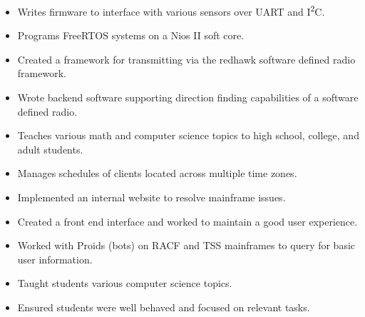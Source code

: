 \documentclass[10pt,a4paper,ragged2e,withhyper]{altacv}
\begin{document}
\begin{paracol}{2}


\begin{itemize}
\item Writes firmware to interface with various sensors over UART and I\textsuperscript{2}C.
\item Programs FreeRTOS systems on a Nios II soft core.
\item Created a framework for transmitting via the redhawk software defined radio framework.
\item Wrote backend software supporting direction finding capabilities of a software defined radio.
\end{itemize}

\divider{}

\begin{itemize}
\item Teaches various math and computer science topics to high school, college, and adult students.
\item Manages schedules of clients located across multiple time zones.
\end{itemize}

\divider{}

\begin{itemize}
\item Implemented an internal website to resolve mainframe issues.
\item Created a front end interface and worked to maintain a good user experience.
\item Worked with Proids (bots) on RACF and TSS mainframes to query for basic user information.
\end{itemize}


\begin{itemize}
\item Taught students various computer science topics.
\item Ensured students were well behaved and focused on relevant tasks.
\end{itemize}


\end{paracol}
\end{document}
